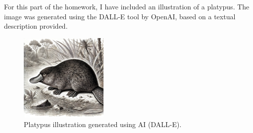 For this part of the homework, I have included an illustration of a platypus. The image was generated using the DALL-E tool by OpenAI, based on a textual description provided.

\begin{figure}[htbp]
    \centering
    \includegraphics[width=0.38\textwidth]{figures/playtus.png}
    \caption{Platypus illustration generated using AI (DALL-E)\cite{openai2024platypus}.}
\end{figure}

